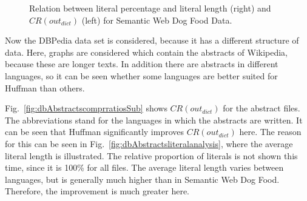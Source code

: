 \begin{figure}[h]
	\centering
	\hfill
	\caption{Relation between literal percentage and literal length (right) and $CR(out_{dict})$ (left) for Semantic Web Dog Food Data.}
	\label{fig:dogfood}
\end{figure}

Now the DBPedia data set is considered, because it has a different structure of data. Here, graphs are considered which contain the abstracts of Wikipedia, because these are longer texts. In addition there are abstracts in different languages, so it can be seen whether some languages are better suited for Huffman than others.

Fig.~\ref{fig:dbAbstractscomprratiosSub} shows $CR(out_{dict})$ for the abstract files. The abbreviations stand for the languages in which the abstracts are written. It can be seen that Huffman significantly improves $CR(out_{dict})$ here. The reason for this can be seen in Fig.~\ref{fig:dbAbstractsliteralanalysis}, where the average literal length is illustrated. The relative proportion of literals is not shown this time, since it is 100\% for all files. The average literal length varies between languages, but is generally much higher than in Semantic Web Dog Food. Therefore, the improvement is much greater here.

